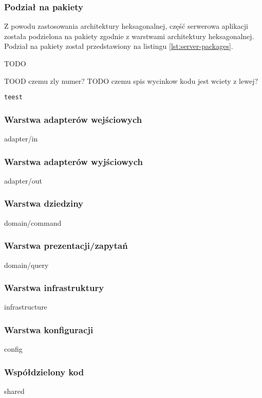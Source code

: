 \subsubsection{Podział na pakiety}

Z powodu zastosowania architektury heksagonalnej, część serwerowa aplikacji została podzielona na pakiety zgodnie z warstwami architektury heksagonalnej. Podział na pakiety został przedstawiony na listingu \ref{lst:server-packages}.

TODO

TOOD czemu zly numer?
TODO czemu spis wycinkow kodu jest wciety z lewej?
\begin{lstlisting}[caption={Podział na pakiety części serwerowej aplikacji},label={lst:server-packages},captionpos=b]
teest
\end{lstlisting}


\subsubsection{Warstwa adapterów wejściowych} adapter/in

\subsubsection{Warstwa adapterów wyjściowych} adapter/out

\subsubsection{Warstwa dziedziny} domain/command

\subsubsection{Warstwa prezentacji/zapytań} domain/query

\subsubsection{Warstwa infrastruktury} infrastructure

\subsubsection{Warstwa konfiguracji} config

\subsubsection{Współdzielony kod} shared

